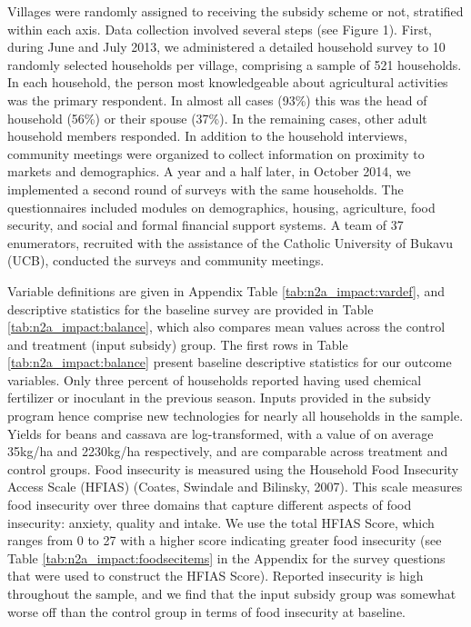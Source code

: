 Villages were randomly assigned to receiving the subsidy scheme or not, stratified within each axis. Data collection involved several steps (see Figure 1). First, during June and July 2013, we administered a detailed household survey to 10 randomly selected households per village, comprising a sample of 521 households.  In each household, the person most knowledgeable about agricultural activities was the primary respondent. In almost all cases (93\%) this was the head of household (56\%) or their spouse (37\%). In the remaining cases, other adult household members responded. In addition to the household interviews, community meetings were organized to collect information on proximity to markets and demographics. A year and a half later, in October 2014, we implemented a second round of surveys with the same households. The questionnaires included modules on demographics, housing, agriculture, food security, and social and formal financial support systems. A team of 37 enumerators, recruited with the assistance of the Catholic University of Bukavu (UCB), conducted the surveys and community meetings.




Variable definitions are given in Appendix Table \ref{tab:n2a_impact:vardef}, and descriptive statistics for the baseline survey are provided in Table \ref{tab:n2a_impact:balance}, which also compares mean values across the control and treatment (input subsidy) group. The first rows in Table \ref{tab:n2a_impact:balance} present baseline descriptive statistics for our outcome variables. Only three percent of households reported having used chemical fertilizer or inoculant in the previous season. Inputs provided in the subsidy program hence comprise new technologies for nearly all households in the sample. Yields for beans and cassava are log-transformed, with a value of on average 35kg/ha and 2230kg/ha respectively, and are comparable across treatment and control groups. Food insecurity is measured using the Household Food Insecurity Access Scale (HFIAS) (Coates, Swindale and Bilinsky, 2007). This scale measures food insecurity over three domains that capture different aspects of food insecurity: anxiety, quality and intake. We use the total HFIAS Score, which ranges from 0 to 27 with a higher score indicating greater food insecurity (see Table \ref{tab:n2a_impact:foodsecitems} in the Appendix for the survey questions that were used to construct the HFIAS Score). Reported insecurity is high throughout the sample, and we find that the input subsidy group was somewhat worse off than the control group in terms of food insecurity at baseline. 

